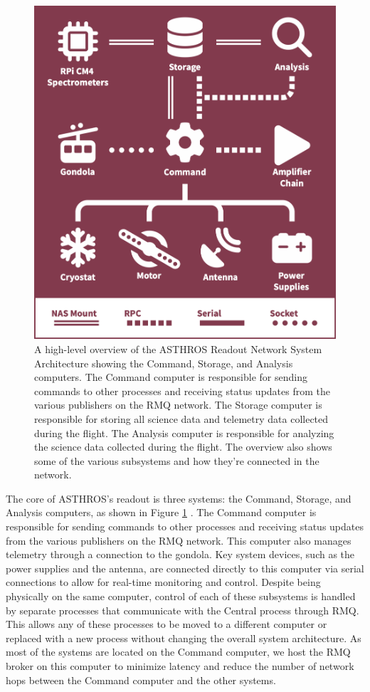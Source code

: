 \begin{figure}
    \centering
    \includegraphics[width=0.5\linewidth]{figs/spectra/system.png}
    \caption[High-Level System Diagram for ASTHROS]{A high-level overview of the ASTHROS Readout Network System Architecture showing the Command, Storage, and Analysis computers. The Command computer is responsible for sending commands to other processes and receiving status updates from the various publishers on the RMQ network. The Storage computer is responsible for storing all science data and telemetry data collected during the flight. The Analysis computer is responsible for analyzing the science data collected during the flight. The overview also shows some of the various subsystems and how they're connected in the network.}
    \label{spectra/fig:system}
\end{figure}

The core of ASTHROS's readout is three systems: the Command, Storage, and Analysis computers, as shown in Figure \ref{spectra/fig:system} \parencite{horton2024readout}.
The Command computer is responsible for sending commands to other processes and receiving status updates from the various publishers on the RMQ network. 
This computer also manages telemetry through a connection to the gondola. 
Key system devices, such as the power supplies and the antenna, are connected directly to this computer via serial connections to allow for real-time monitoring and control.
Despite being physically on the same computer, control of each of these subsystems is handled by separate processes that communicate with the Central process through RMQ.
This allows any of these processes to be moved to a different computer or replaced with a new process without changing the overall system architecture.
As most of the systems are located on the Command computer, we host the RMQ broker on this computer to minimize latency and reduce the number of network hops between the Command computer and the other systems.

